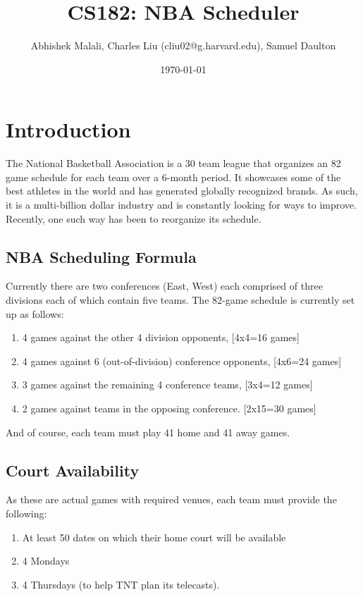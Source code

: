 \documentclass{article}
\begin{document}
	\title{CS182: NBA Scheduler}
	\author{Abhishek Malali, Charles Liu (cliu02@g.harvard.edu), Samuel Daulton}
	\date{\today}
	\maketitle
	
	\section{Introduction}
	
	The National Basketball Association is a 30 team league that organizes an 82 game schedule for each team over a 6-month period. It showcases some of the best athletes in the world and has generated globally recognized brands. As such, it is a multi-billion dollar industry and is constantly looking for ways to improve. Recently, one such way has been to reorganize its schedule.
	
	\subsection{NBA Scheduling Formula}

	Currently there are two conferences (East, West) each comprised of three divisions each of which contain five teams. The 82-game schedule is currently set up as follows:

	\begin{enumerate}
		\item 4 games against the other 4 division opponents, [4x4=16 games]
		\item 4 games against 6 (out-of-division) conference opponents, [4x6=24 games]
		\item 3 games against the remaining 4 conference teams, [3x4=12 games]
		\item 2 games against teams in the opposing conference. [2x15=30 games]
	\end{enumerate}

	And of course, each team must play 41 home and 41 away games. 
	
	\subsection{Court Availability}

	As these are actual games with required venues, each team must provide the following:

	\begin{enumerate}
		\item At least 50 dates on which their home court will be available
		\item 4 Mondays
		\item 4 Thursdays (to help TNT plan its telecasts).
	\end{enumerate}
\end{document}
